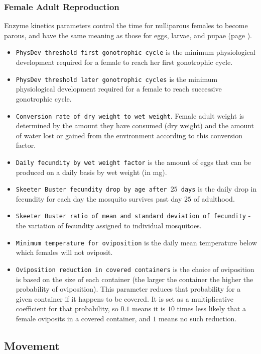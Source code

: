 \documentclass[11pt]{article}
\newcommand{\linecmd}[1]{\texttt{#1}}
\begin{document}
\subsubsection{Female Adult Reproduction}

Enzyme kinetics parameters control the time for nulliparous females to become parous, and have the same meaning as those for eggs, larvae, and pupae (page \pageref{kinetics}).

\begin{itemize}
	\item \linecmd{PhysDev threshold first gonotrophic cycle} is the minimum physiological development required for a female to reach her first gonotrophic cycle.
	\item \linecmd{PhysDev threshold later gonotrophic cycles} is the minimum physiological development required for a female to reach successive gonotrophic cycle. 
	\item \linecmd{Conversion rate of dry weight to wet weight}. Female adult weight is determined by the amount they have consumed (dry weight) and the amount of water lost or gained from the environment according to this conversion factor.
	\item \linecmd{Daily fecundity by wet weight factor} is the amount of eggs that can be produced on a daily basis by wet weight (in mg).
	\item \linecmd{Skeeter Buster fecundity drop by age after $25$ days} is the daily drop in fecundity for each day the mosquito survives past day $25$ of adulthood.
	\item \linecmd{Skeeter Buster ratio of mean and standard deviation of fecundity} - the variation of fecundity assigned to individual mosquitoes.
	\item \linecmd{Minimum temperature for oviposition} is the daily mean temperature below which females will not oviposit.
	\item \linecmd{Oviposition reduction in covered containers} is the choice of oviposition is based on the size of each container (the larger the container the higher the probability of oviposition). This parameter reduces that probability for a given container if it happens to be covered. It is set as a multiplicative coefficient for that probability, so $0.1$ means it is $10$ times less likely that a female oviposits in a covered container, and $1$ means no such reduction. 
\end{itemize}

\subsection{Movement}
\end{document}
